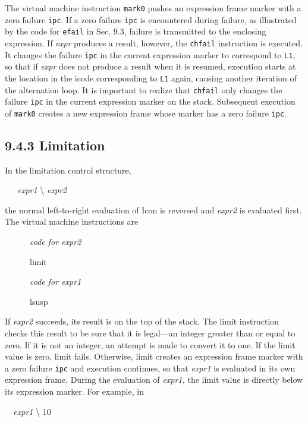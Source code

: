 The virtual machine instruction \texttt{mark0} pushes an expression
frame marker with a zero failure \texttt{ipc}. If a zero failure
\texttt{ipc} is encountered during failure, as illustrated by the code
for \texttt{efail} in Sec. 9.3, failure is transmitted to the
enclosing expression. If \textit{expr }produces a result, however, the
\texttt{chfail} instruction is executed. It changes the failure
\texttt{ipc} in the current expression marker to correspond to
\texttt{L1}, so that if \textit{expr }does not produce a result when
it is resumed, execution starts at the location in the icode
corresponding to \texttt{L1} again, causing another iteration of the
alternation loop. It is important to realize that \texttt{chfail} only
changes the failure \texttt{ipc} in the current expression marker on
the stack.  Subsequent execution of \texttt{mark0} creates a new
expression frame whose marker has a zero failure \texttt{ipc}.

\subsection[9.4.3 Limitation]{9.4.3 Limitation}

In the limitation control structure,

{\ttfamily\mdseries
\textit{\ \ \ expr1 }{\textbackslash} \textit{expr2}}

\noindent the normal left-to-right evaluation of Icon is reversed and
\textit{expr2 }is evaluated first. The virtual machine instructions are

{\ttfamily\mdseries
\ \ \ \ \ \ \textit{code for expr2}}

{\ttfamily\mdseries
\ \ \ \ \ \ limit}

{\ttfamily\mdseries
\ \ \ \ \ \ \textit{code for expr1}}

{\ttfamily\mdseries
\ \ \ \ \ \ lsusp}

If \textit{expr2 }succeeds, its result is on the top of the stack. The
limit instruction checks this result to be sure that it is legal---an
integer greater than or equal to zero. If it is not an integer, an
attempt is made to convert it to one. If the limit value is zero,
limit fails. Otherwise, limit creates an expression frame marker with
a zero failure \texttt{ipc} and execution continues, so that
\textit{expr1 }is evaluated in its own expression frame. During the
evaluation of \textit{expr1, }the limit value is directly below its
expression marker. For example, in

{\ttfamily\mdseries
\textit{\ \ expr1 }{\textbackslash} 10}

